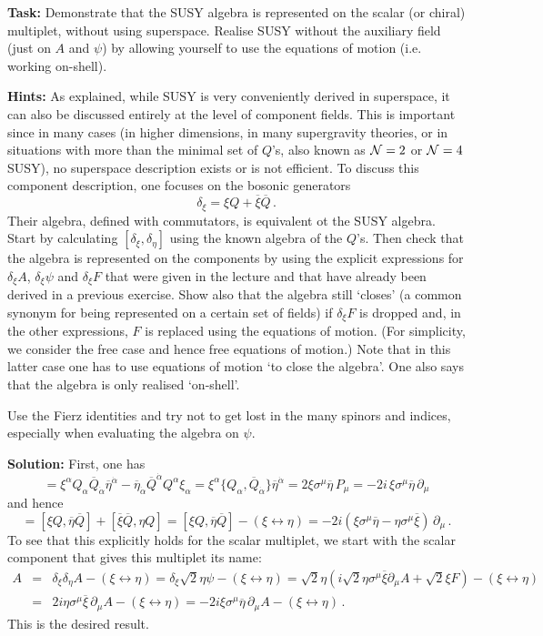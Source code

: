 \documentclass[12pt]{article}
\newcommand{\be}{\begin{equation}}
\newcommand{\ee}{\end{equation}}
\newcommand{\bea}{\begin{eqnarray}}
\newcommand{\eea}{\end{eqnarray}}
\newcommand{\ol}{\overline}
\numberwithin{equation}{section}
\begin{document}
{\bf Task:} Demonstrate that the SUSY algebra is represented on the scalar (or chiral) multiplet, without using superspace. Realise SUSY without the auxiliary field (just on $A$ and $\psi$) by allowing yourself to use the equations of motion (i.e. working on-shell).

\noindent
{\bf Hints:} As explained, while SUSY is very conveniently derived in superspace, it can also be discussed entirely at the level of component fields. This is important since in many cases (in higher dimensions, in many supergravity theories, or in situations with more than the minimal set of $Q$'s, also known as ${\cal N}=2$ or ${\cal N}=4$ SUSY), no superspace description exists or is not efficient. To discuss this component description, one focuses on the bosonic generators 
\be
\delta_\xi=\xi Q+\ol{\xi}\ol{Q}\,.
\ee
Their algebra, defined with commutators, is equivalent ot the SUSY algebra. Start by calculating $[\delta_\xi,\delta_\eta]$ using the known algebra of the $Q$'s. Then check that the algebra is represented on the components by using the explicit expressions for $\delta_\xi A$, $\delta_\xi \psi$ and $\delta_\xi F$ that were given in the lecture and that have already been derived in a previous exercise. Show also that the algebra still `closes' (a common synonym for being represented on a certain set of fields) if $\delta_\xi F$ is dropped and, in the other expressions, $F$ is replaced using the equations of motion. (For simplicity, we consider the free case and hence free equations of motion.) Note that in this latter case one has to use equations of motion `to close the algebra'. One also says that the algebra is only realised `on-shell'.

Use the Fierz identities and try not to get lost in the many spinors and indices, especially when evaluating the algebra on $\psi$. 

\noindent
{\bf Solution:} First, one has
\be
[\xi Q,\ol{\eta}\ol{Q}]=\xi^\alpha Q_\alpha\ol{Q}_{\dot{\alpha}} \ol{\eta}^{\dot{\alpha}} - \ol{\eta}_{\dot{\alpha}} \ol{Q}^{\dot{\alpha}} Q^\alpha \xi_\alpha
= \xi^\alpha \{Q_\alpha,\ol{Q}_{\dot{\alpha}}\} \ol{\eta}^{\dot{\alpha}} = 2 \xi\sigma^\mu \ol{\eta}\,P_\mu = -2i\, \xi\sigma^\mu\ol{\eta}\, \partial_\mu
\ee
and hence
\be
[\delta_\xi,\delta_\eta]=[\xi Q,\ol{\eta}\ol{Q}]+[\ol{\xi}\ol{Q}, \eta Q] = [\xi Q,\ol{\eta}\ol{Q}] - (\xi\leftrightarrow \eta) = -2i (\xi\sigma^\mu\ol{\eta} - \eta\sigma^\mu \ol{\xi}) \,\partial_\mu\,.
\ee
To see that this explicitly holds for the scalar multiplet, we start with the scalar component that gives this multiplet its name:
\bea
[\delta_\xi,\delta_\eta]A &=& \delta_\xi \delta_\eta A- (\xi\leftrightarrow \eta) = \delta_\xi \sqrt{2} \eta\psi - (\xi\leftrightarrow \eta) = \sqrt{2}\eta (i\sqrt{2}\eta \sigma^\mu\ol{\xi}\partial_\mu A +\sqrt{2}\xi F) - (\xi\leftrightarrow \eta)
\nonumber \\
&=& 2i\eta \sigma^\mu\ol{\xi}\,\partial_\mu A 
- (\xi\leftrightarrow \eta) = -2i\xi \sigma^\mu\ol{\eta}\,\partial_\mu A - (\xi\leftrightarrow \eta)
\,. \eea
This is the desired result.
\end{document}
